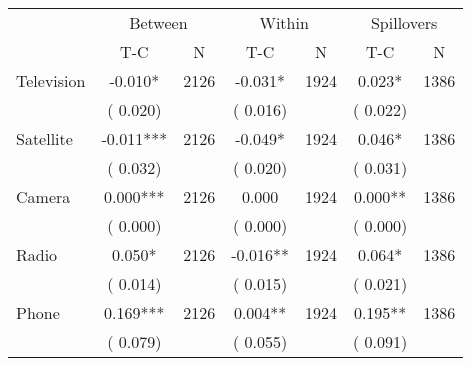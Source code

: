 
\begin{tabular}{l*{6}{c}}\hline&\multicolumn{2}{c}{Between}&\multicolumn{2}{c}{Within}&\multicolumn{2}{c}{Spillovers} \\ \cmidrule(r){2-3}\cmidrule(l){4-5}\cmidrule(l){6-7} & {T-C} & {N} & {T-C} & {N}  & {T-C}  & {N}  \\ \midrule
Television        &             -0.010*      &       2126       &             -0.031*      &       1924       &              0.023*      &       1386       \\
                       &       (       0.020)            &                               &       (       0.016)            &                               &       (       0.022)            &                               \\
Satellite        &             -0.011***      &       2126       &             -0.049*      &       1924       &              0.046*      &       1386       \\
                       &       (       0.032)            &                               &       (       0.020)            &                               &       (       0.031)            &                               \\
Camera        &              0.000***      &       2126       &              0.000      &       1924       &              0.000**      &       1386       \\
                       &       (       0.000)            &                               &       (       0.000)            &                               &       (       0.000)            &                               \\
Radio        &              0.050*      &       2126       &             -0.016**      &       1924       &              0.064*      &       1386       \\
                       &       (       0.014)            &                               &       (       0.015)            &                               &       (       0.021)            &                               \\
Phone        &              0.169***      &       2126       &              0.004**      &       1924       &              0.195**      &       1386       \\
                       &       (       0.079)            &                               &       (       0.055)            &                               &       (       0.091)            &                               \\
\hline \end{tabular}